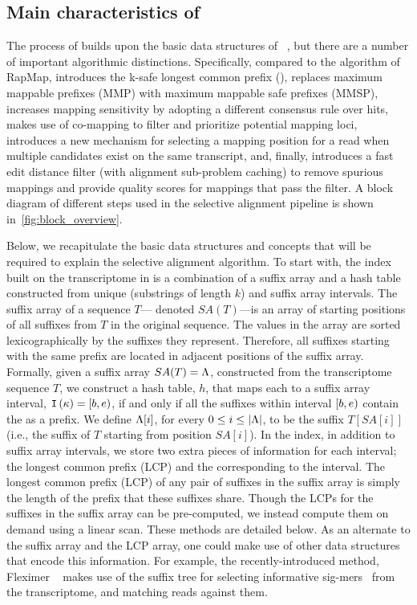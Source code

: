 \subsection{Main characteristics of \sla}

The process of \sla builds upon the basic data structures of 
\rapmap~\citep{Srivastava2016rapmap}, 
but there are a number of important algorithmic distinctions. Specifically, compared to 
the algorithm of RapMap, \sla introduces the k-safe longest common prefix (\kslcp), 
replaces maximum mappable prefixes (MMP) with maximum mappable safe prefixes (MMSP), 
increases mapping sensitivity by adopting a different consensus rule over hits, makes 
use of co-mapping to filter and prioritize potential mapping loci, introduces a new 
mechanism for selecting a mapping position for a read when multiple candidates exist on 
the same transcript, and, finally, introduces a fast edit distance filter (with alignment 
sub-problem caching) to remove spurious mappings and provide quality scores for 
mappings that pass the filter. A block diagram of different steps used in the selective 
alignment pipeline is shown in~\cref{fig:block_overview}.

Below, we recapitulate the basic data structures and concepts that will be required to 
explain the selective alignment algorithm. To start with, the index built on the 
transcriptome in \sla is a combination of a suffix array and a hash table constructed 
from unique \kmers (substrings of length $k$) and suffix array intervals. The suffix 
array of a sequence $T$--- denoted $SA(T)$---is an array of starting positions of all 
suffixes from $T$ in the original sequence. The values in the array are sorted 
lexicographically by the suffixes they represent. Therefore, all suffixes starting 
with the same prefix are located in adjacent positions of the suffix array. Formally, 
given a suffix array $SA(T)=\Lambda$, constructed from the transcriptome sequence 
$T$, we construct a hash table, $h$, that maps each \kmer \samplekmer to a suffix array 
interval, $\texttt{I}\left({\kappa}\right) = \left[b,e\right)$, if and only if all the suffixes within 
interval $\left[b,e\right)$ contain the \kmer \samplekmer as a prefix. We define 
$\Lambda[i]$, for every $0\le i \le |\Lambda|$, to be the suffix $T[SA[i]]$ 
(i.e., the suffix of $T$ starting from position $SA[i]$). In the \sla index, in addition to 
suffix array intervals, we store two extra pieces of information for each interval; the 
longest common prefix (LCP) and the \kslcp corresponding to the interval. The longest 
common prefix (LCP) of any pair of suffixes in the suffix array is simply the length of 
the prefix that these suffixes share. Though the LCPs for the suffixes in the suffix array 
can be pre-computed, we instead compute them on demand using a linear scan. These methods 
are detailed below. As an alternate to the suffix array and the LCP array, one could make 
use of other data structures that encode this information. For example, the 
recently-introduced method, Fleximer ~\citep{ju2017fleximer} makes use of the suffix 
tree for selecting informative sig-mers~\citep{zhang2014rna} from the transcriptome, and 
matching reads against them.

